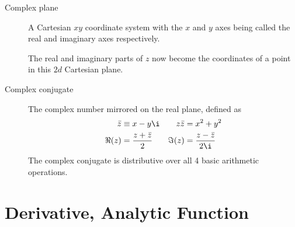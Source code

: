 \begin{description}
    \item[Complex plane] A Cartesian $ xy $ coordinate system with the $ x $ and $ y $
        axes being called the real and imaginary axes respectively. \par
        The real and imaginary parts of $ z $ now become the coordinates of a point in
        this $ 2d $ Cartesian plane.

    \item[Complex conjugate] The complex number mirrored on the real plane, defined as
        \begin{align}
            \bar{z}  & \equiv x - y\i            &
            z\bar{z} & = x^2 + y^2                 \\
            \Re(z)   & = \frac{z + \bar{z}}{2}   &
            \Im(z)   & = \frac{z - \bar{z}}{2\i}
        \end{align}
        The complex conjugate is distributive over all 4 basic arithmetic operations.
\end{description}

\section{Derivative, Analytic Function}

